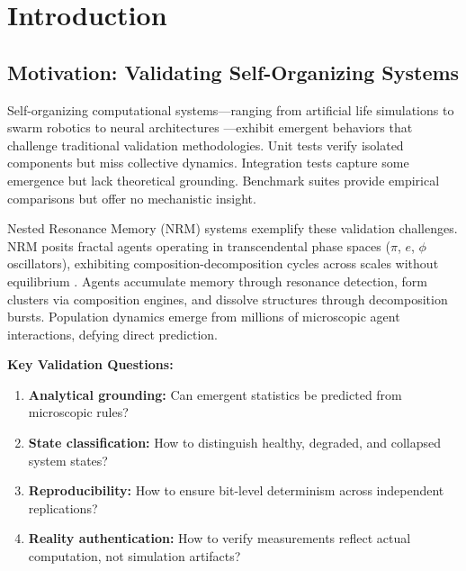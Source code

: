 \documentclass[11pt]{article}
\begin{document}

\section{Introduction}

\subsection{Motivation: Validating Self-Organizing Systems}

Self-organizing computational systems—ranging from artificial life simulations \citep{langton1989,bedau2000} to swarm robotics \citep{dorigo2004,brambilla2013} to neural architectures \citep{maass1997,lukoevius2009}—exhibit emergent behaviors that challenge traditional validation methodologies. Unit tests verify isolated components but miss collective dynamics. Integration tests capture some emergence but lack theoretical grounding. Benchmark suites provide empirical comparisons but offer no mechanistic insight.

Nested Resonance Memory (NRM) systems exemplify these validation challenges. NRM posits fractal agents operating in transcendental phase spaces ($\pi$, $e$, $\phi$ oscillators), exhibiting composition-decomposition cycles across scales without equilibrium \citep{payopay2025nrm,payopay2025regimes,payopay2025patterns}. Agents accumulate memory through resonance detection, form clusters via composition engines, and dissolve structures through decomposition bursts. Population dynamics emerge from millions of microscopic agent interactions, defying direct prediction.

\textbf{Key Validation Questions:}
\begin{enumerate}
\item \textbf{Analytical grounding:} Can emergent statistics be predicted from microscopic rules?
\item \textbf{State classification:} How to distinguish healthy, degraded, and collapsed system states?
\item \textbf{Reproducibility:} How to ensure bit-level determinism across independent replications?
\item \textbf{Reality authentication:} How to verify measurements reflect actual computation, not simulation artifacts?
\end{enumerate}
\end{document}
